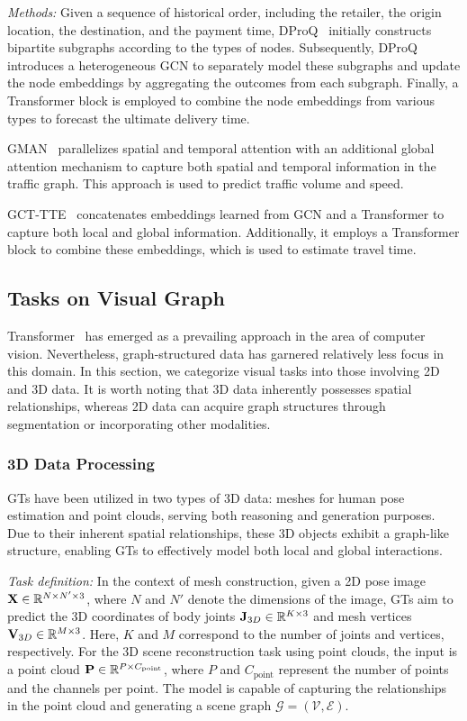 \textit{Methods:} Given a sequence of historical order, including the retailer, the origin location, the destination, and the payment time, DProQ~\cite{zhou2023inductive} initially constructs bipartite subgraphs according to the types of nodes. Subsequently, DProQ introduces a heterogeneous GCN to separately model these subgraphs and update the node embeddings by aggregating the outcomes from each subgraph. Finally, a Transformer block is employed to combine the node embeddings from various types to forecast the ultimate delivery time.

GMAN~\cite{zheng2020gman} parallelizes spatial and temporal attention with an additional global attention mechanism to capture both spatial and temporal information in the traffic graph. This approach is used to predict traffic volume and speed.

GCT-TTE~\cite{mashurov2024gct} concatenates embeddings learned from GCN and a Transformer to capture both local and global information. Additionally, it employs a Transformer block to combine these embeddings, which is used to estimate travel time.


\subsection{Tasks on Visual Graph}
\label{sec:application-visual}
Transformer~\cite{dosovitskiy2021an} has emerged as a prevailing approach in the area of computer vision. Nevertheless, graph-structured data has garnered relatively less focus in this domain. In this section, we categorize visual tasks into those involving 2D and 3D data. It is worth noting that 3D data inherently possesses spatial relationships, whereas 2D data can acquire graph structures through segmentation or incorporating other modalities.
\subsubsection{\textbf{3D Data Processing}}
GTs have been utilized in two types of 3D data: meshes for human pose estimation and point clouds, serving both reasoning and generation purposes. Due to their inherent spatial relationships, these 3D objects exhibit a graph-like structure, enabling GTs to effectively model both local and global interactions.

\textit{Task definition:} In the context of mesh construction, given a 2D pose image $\mathbf{X} \in \mathbb{R}^{N \times N' \times 3}$, where $N$ and $N'$ denote the dimensions of the image, GTs aim to predict the 3D coordinates of body joints $\mathbf{J}_{3D} \in \mathbb{R}^{K \times 3}$ and mesh vertices $\mathbf{V}_{3D} \in \mathbb{R}^{M \times 3}$. Here, $K$ and $M$ correspond to the number of joints and vertices, respectively. For the 3D scene reconstruction task using point clouds, the input is a point cloud $\mathbf{P} \in \mathbb{R}^{P \times C_{\text{point}}}$, where $P$ and $C_{\text{point}}$ represent the number of points and the channels per point. The model is capable of capturing the relationships in the point cloud and generating a scene graph $\mathcal G = (\mathcal V, \mathcal E)$.

